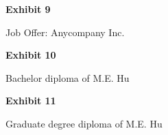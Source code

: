 \documentclass{article}
\begin{document}
% 


\vspace*{\fill}
\begin{center}

{\LARGE \bf
Exhibit 9
}

\vspace{10\baselineskip}

{\large Job Offer: Anycompany Inc.}

\end{center}
\vspace*{\fill}

% 




\vspace*{\fill}
\begin{center}

{\LARGE \bf
Exhibit 10
}

\vspace{10\baselineskip}

{\large Bachelor diploma of M.E. Hu}

\end{center}
\vspace*{\fill}

% 

% 


\vspace*{\fill}
\begin{center}

{\LARGE \bf
Exhibit 11
}

\vspace{10\baselineskip}

{\large Graduate degree diploma of M.E. Hu}

\end{center}
\vspace*{\fill}

% 

% 

% 
\end{document}
